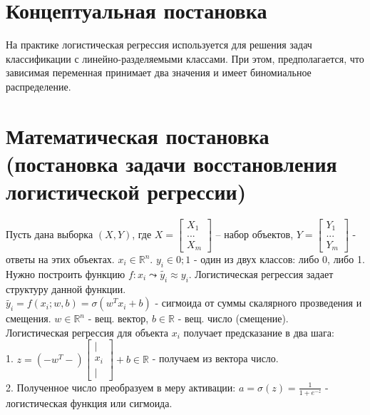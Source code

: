 \documentclass[12pt, letterpaper, twoside]{article}
\begin{document}
\section{Концептуальная постановка}

На практике логистическая регрессия используется для решения задач классификации с линейно-разделяемыми классами. При этом, предполагается, что зависимая переменная принимает два значения и имеет биномиальное распределение.

\section{Математическая постановка (постановка задачи восстановления логистической регрессии)}

Пусть дана выборка $(X,Y)$, где $X = \begin{bmatrix}
	X_{1} \\
	... \\
	X_{m}
\end{bmatrix}$ -- набор объектов, $Y = \begin{bmatrix}
Y_{1} \\
... \\
Y_{m}
\end{bmatrix}$ - ответы на этих объектах. $x_{i} \in \mathbb{R}^{n}$. $y_{i} \in {0;1}$ - один из двух классов: либо 0, либо 1. \\

Нужно построить функцию $f: x_{i}  \leadsto \widetilde{y_{i}} \approx y_{i}$. Логистическая регрессия задает структуру данной функции. \\

$\widetilde{y_{i}} = f(x_{i}; w, b) = \sigma(w^{T}x_{i}+b)$ - сигмоида от суммы скалярного прозведения и смещения. $w \in \mathbb{R}^{n}$ - вещ. вектор, $b \in \mathbb{R}$ - вещ. число (смещение). \\

Логистическая регрессия для объекта $x_{i}$ получает предсказание в два шага: \\
1. $z = (- w^{T} -) \begin{bmatrix}
	| \\
	x_{i} \\
	|
\end{bmatrix} + b \in \mathbb{R}$ - получаем из вектора число.\\
2. Полученное число преобразуем в меру активации: $a = \sigma(z) = \frac{1}{1+e^{-z}}$ - логистическая функция или сигмоида. \\
\end{document}
